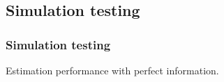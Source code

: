\subsection{Simulation testing} %
\label{sub:simulation_testing}
\begin{frame}[t]\frametitle{Simulation testing}
	Estimation performance with perfect information.\\
	\begin{center}
\end{center}
\end{frame}
